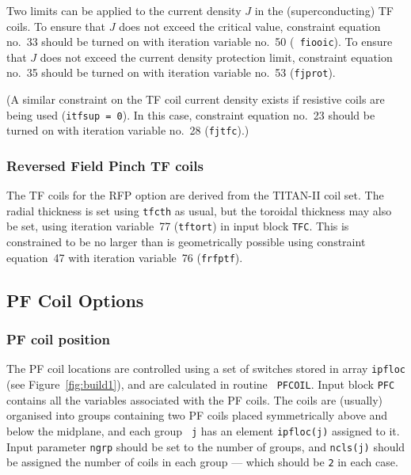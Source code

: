 
Two limits can be applied to the current density $J$ in the (superconducting)
TF coils. To ensure that $J$ does not exceed the critical value, constraint
equation no.\ 33 should be turned on with iteration variable no.\ 50 ({\tt
fiooic}). To ensure that $J$ does not exceed the current density protection
limit, constraint equation no.\ 35 should be turned on with iteration variable
no.\ 53 ({\tt fjprot}).
\setlength{\parskip}{5mm}

(A similar constraint on the TF coil current density exists if resistive coils
are being used ({\tt itfsup = 0}). In this case, constraint equation no.\ 23
should be turned on with iteration variable no.\ 28 ({\tt fjtfc}).)
\setlength{\parskip}{0mm}

\subsubsection{Reversed Field Pinch TF coils}

The TF coils for the RFP option are derived from the TITAN-II coil set. The
radial thickness is set using \texttt{tfcth} as usual, but the toroidal
thickness may also be set, using iteration variable~77 (\texttt{tftort}) in
input block \texttt{TFC}. This is constrained to be no larger than is
geometrically possible using constraint equation~47 with iteration variable~76
(\texttt{frfptf}).

\subsection{PF Coil Options}

\subsubsection{PF coil position}

The PF coil locations are controlled using a set of switches stored in array
{\tt ipfloc} (see Figure~\ref{fig:build1}), and are calculated in routine {\tt
PFCOIL}. Input block {\tt PFC} contains all the variables associated with the
PF coils. The coils are (usually) organised into groups containing two PF
coils placed symmetrically above and below the midplane, and each group {\tt
j} has an element {\tt ipfloc(j)} assigned to it. Input parameter {\tt ngrp}
should be set to the number of groups, and {\tt ncls(j)} should be assigned
the number of coils in each group --- which should be {\tt 2} in each case.
\setlength{\parskip}{5mm}

